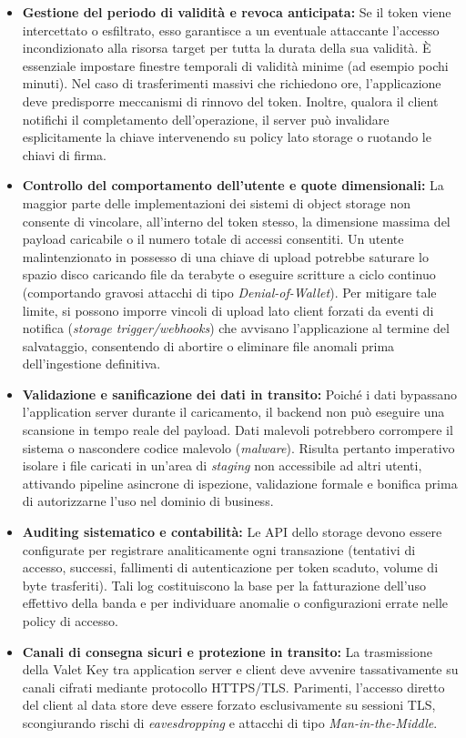 \documentclass[11pt, a4paper]{article}
\begin{document}
\begin{itemize}[noitemsep]
    \item \textbf{Gestione del periodo di validità e revoca anticipata:}
    Se il token viene intercettato o esfiltrato, esso garantisce a un eventuale attaccante l'accesso incondizionato alla risorsa target per tutta la durata della sua validità. È essenziale impostare finestre temporali di validità minime (ad esempio pochi minuti). Nel caso di trasferimenti massivi che richiedono ore, l'applicazione deve predisporre meccanismi di rinnovo del token. Inoltre, qualora il client notifichi il completamento dell'operazione, il server può invalidare esplicitamente la chiave intervenendo su policy lato storage o ruotando le chiavi di firma.

    \item \textbf{Controllo del comportamento dell'utente e quote dimensionali:}
    La maggior parte delle implementazioni dei sistemi di object storage non consente di vincolare, all'interno del token stesso, la dimensione massima del payload caricabile o il numero totale di accessi consentiti. Un utente malintenzionato in possesso di una chiave di upload potrebbe saturare lo spazio disco caricando file da terabyte o eseguire scritture a ciclo continuo (comportando gravosi attacchi di tipo \emph{Denial-of-Wallet}). Per mitigare tale limite, si possono imporre vincoli di upload lato client forzati da eventi di notifica (\emph{storage trigger/webhooks}) che avvisano l'applicazione al termine del salvataggio, consentendo di abortire o eliminare file anomali prima dell'ingestione definitiva.

    \item \textbf{Validazione e sanificazione dei dati in transito:}
    Poiché i dati bypassano l'application server durante il caricamento, il backend non può eseguire una scansione in tempo reale del payload. Dati malevoli potrebbero corrompere il sistema o nascondere codice malevolo (\emph{malware}). Risulta pertanto imperativo isolare i file caricati in un'area di \emph{staging} non accessibile ad altri utenti, attivando pipeline asincrone di ispezione, validazione formale e bonifica prima di autorizzarne l'uso nel dominio di business.

    \item \textbf{Auditing sistematico e contabilità:}
    Le API dello storage devono essere configurate per registrare analiticamente ogni transazione (tentativi di accesso, successi, fallimenti di autenticazione per token scaduto, volume di byte trasferiti). Tali log costituiscono la base per la fatturazione dell'uso effettivo della banda e per individuare anomalie o configurazioni errate nelle policy di accesso.

    \item \textbf{Canali di consegna sicuri e protezione in transito:}
    La trasmissione della Valet Key tra application server e client deve avvenire tassativamente su canali cifrati mediante protocollo HTTPS/TLS. Parimenti, l'accesso diretto del client al data store deve essere forzato esclusivamente su sessioni TLS, scongiurando rischi di \emph{eavesdropping} e attacchi di tipo \emph{Man-in-the-Middle}.
\end{itemize}
\end{document}
